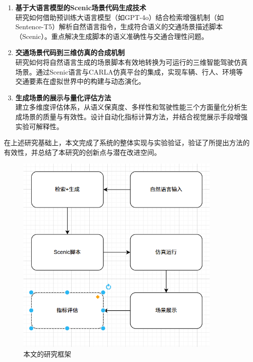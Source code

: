 \begin{enumerate}
	\item \textbf{基于大语言模型的Scenic场景代码生成技术} \\
	研究如何借助预训练大语言模型（如GPT-4o）结合检索增强机制（如Sentence-T5）解析自然语言指令，生成符合语义的交通场景描述脚本（Scenic）。重点解决生成脚本的语义准确性与交通合理性问题。
	
	\item \textbf{交通场景代码到三维仿真的合成机制} \\
	研究如何将自然语言生成的场景脚本有效地转换为可运行的三维智能驾驶仿真场景。通过Scenic语言与CARLA仿真平台的集成，实现车辆、行人、环境等交通要素在虚拟世界中的构建与动态演化。
	
	\item \textbf{生成场景的展示与量化评估方法} \\
	建立多维度评估体系，从语义保真度、多样性和驾驶性能三个方面量化分析生成场景的质量与有效性。设计自动化指标计算方法，并结合视觉展示手段增强实验可解释性。
\end{enumerate}

在上述研究基础上，本文完成了系统的整体实现与实验验证，验证了所提出方法的有效性，并总结了本研究的创新点与潜在改进空间。

\begin{figure}[H]
	\centering
	\includegraphics[width=0.9\textwidth]{../images/研究架构.png} 
	\caption{本文的研究框架}
	\label{fig:research_framework}
\end{figure}

